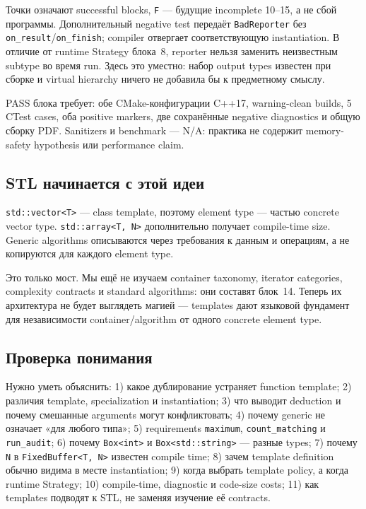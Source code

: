 Точки означают successful blocks, \texttt{F} --- будущие incomplete 10--15,
а не сбой программы. Дополнительный negative test передаёт
\texttt{BadReporter} без \texttt{on\_result}/\texttt{on\_finish}; compiler
отвергает соответствующую instantiation. В отличие от runtime Strategy блока~8,
reporter нельзя заменить неизвестным subtype во время run. Здесь это уместно:
набор output types известен при сборке и virtual hierarchy ничего не добавила
бы к предметному смыслу.

PASS блока требует: обе CMake-конфигурации C++17, warning-clean builds, 5
CTest cases, оба positive markers, две сохранённые negative diagnostics и
общую сборку PDF. Sanitizers и benchmark --- N/A: практика не содержит
memory-safety hypothesis или performance claim.

\subsection{STL начинается с этой идеи}

\texttt{std::vector<T>} --- class template, поэтому element type ---
частью concrete vector type. \texttt{std::array<T, N>} дополнительно получает
compile-time size. Generic algorithms описываются через требования к данным и
операциям, а не копируются для каждого element type.

Это только мост. Мы ещё не изучаем container taxonomy, iterator categories,
complexity contracts и standard algorithms: они составят блок~14. Теперь их
архитектура не будет выглядеть магией --- templates дают языковой фундамент
для независимости container/algorithm от одного concrete element type.

\subsection{Проверка понимания}

Нужно уметь объяснить:
1) какое дублирование устраняет function template; 2) различия template, specialization и instantiation; 3) что выводит deduction и почему смешанные arguments могут конфликтовать; 4) почему generic не означает «для любого типа»; 5) requirements \texttt{maximum}, \texttt{count\_matching} и \texttt{run\_audit}; 6) почему \texttt{Box<int>} и \texttt{Box<std::string>} --- разные types; 7) почему \texttt{N} в \texttt{FixedBuffer<T, N>} известен compile time; 8) зачем template definition обычно видима в месте instantiation; 9) когда выбрать template policy, а когда runtime Strategy; 10) compile-time, diagnostic и code-size costs; 11) как templates подводят к STL, не заменяя изучение её contracts.

